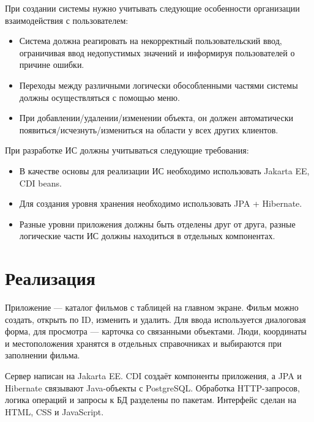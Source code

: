 \documentclass[12pt,a4paper]{article}
\begin{document}
При создании системы нужно учитывать следующие особенности организации взаимодействия с пользователем:


\begin{itemize}[leftmargin=*]

\item Система должна реагировать на некорректный пользовательский ввод, ограничивая ввод недопустимых значений и информируя пользователей о причине ошибки.

\item Переходы между различными логически обособленными частями системы должны осуществляться с помощью меню.

\item При добавлении/удалении/изменении объекта, он должен автоматически появиться/исчезнуть/измениться на области у всех других клиентов.

\end{itemize}

При разработке ИС должны учитываться следующие требования:


\begin{itemize}[leftmargin=*]

\item В качестве основы для реализации ИС необходимо использовать Jakarta EE, CDI beans.

\item Для создания уровня хранения необходимо использовать JPA + Hibernate.

\item Разные уровни приложения должны быть отделены друг от друга, разные логические части ИС должны находиться в отдельных компонентах.

\end{itemize}


\clearpage
\section*{Реализация}

Приложение — каталог фильмов с таблицей на главном экране. Фильм можно создать, открыть по ID, изменить и удалить. Для ввода используется диалоговая форма, для просмотра — карточка со связанными объектами. Люди, координаты и местоположения хранятся в отдельных справочниках и выбираются при заполнении фильма.

Сервер написан на Jakarta EE. CDI создаёт компоненты приложения, а JPA и Hibernate связывают Java-объекты с PostgreSQL. Обработка HTTP-запросов, логика операций и запросы к БД разделены по пакетам. Интерфейс сделан на HTML, CSS и JavaScript.
\end{document}
